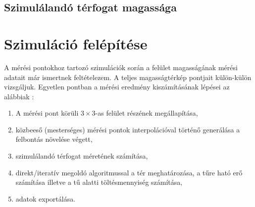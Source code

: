 \subsection{Szimulálandó térfogat magassága}
	
\section{Szimuláció felépítése} \label{sec:sim_felepites}

	A mérési pontokhoz tartozó szimulációk során a felület magasságának mérési adatait már ismertnek feltételezem.
	A teljes magasságtérkép pontjait külön-külön vizsgáljuk.
	Egyetlen pontban a mérési eredmény kiszámításának lépései az alábbiak :
	\begin{enumerate}
		\item A mérési pont körüli $3\times3$-as felület részének megállapítása,
		\item közbeeső (mesterséges) mérési pontok interpolációval történő generálása a felbontás növelése végett,
		\item szimulálandó térfogat méretének számítása,
		\item direkt/iteratív megoldó algoritmussal a tér meghatározása, a tűre ható erő számítása illetve a tű alatti töltésmennyiség
		számítása,
		\item adatok exportálása.
	\end{enumerate}
	

	